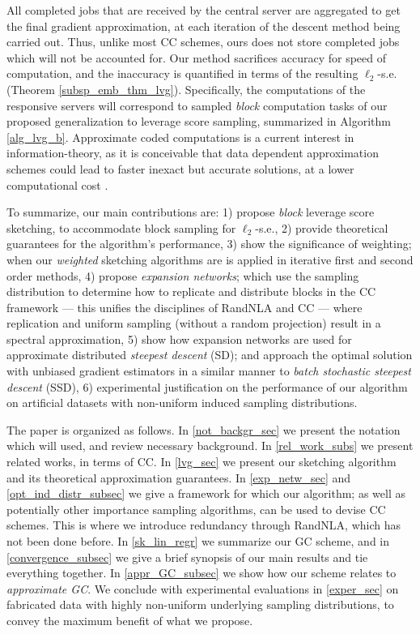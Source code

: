 \documentclass[journal,letterpaper,onecolumn,twoside,nofonttune]{IEEEtran}
\begin{document}
All completed jobs that are received by the central server are aggregated to get the final gradient approximation, at each iteration of the descent method being carried out. Thus, unlike most CC schemes, ours does not store completed jobs which will not be accounted for. Our method sacrifices accuracy for speed of computation, and the inaccuracy is quantified in terms of the resulting $\ell_2$-s.e. (Theorem \ref{subsp_emb_thm_lvg}). Specifically, the computations of the responsive servers will correspond to sampled \textit{block} computation tasks of our proposed generalization to leverage score sampling, summarized in Algorithm \ref{alg_lvg_b}. Approximate coded computations is a current interest in information-theory, as it is conceivable that data dependent approximation schemes could lead to faster inexact but accurate solutions, at a lower computational cost \cite{LA20}.

To summarize, our main contributions are: 1) propose \textit{block} leverage score sketching, to accommodate block sampling for $\ell_2$-s.e., 2) provide theoretical guarantees for the algorithm's performance, 3) show the significance of weighting; when our \textit{weighted} sketching algorithms are is applied in iterative first and second order methods, 4) propose \textit{expansion networks}; which use the sampling distribution to determine how to replicate and distribute blocks in the CC framework --- this unifies the disciplines of RandNLA and CC --- where replication and uniform sampling (without a random projection) result in a spectral approximation, 5) show how expansion networks are used for approximate distributed \textit{steepest descent} (SD); and approach the optimal solution with unbiased gradient estimators in a similar manner to \textit{batch stochastic steepest descent} (SSD), 6) experimental justification on the performance of our algorithm on artificial datasets with non-uniform induced sampling distributions.

The paper is organized as follows. In \ref{not_backgr_sec} we present the notation which will used, and review necessary background. In \ref{rel_work_subs} we present related works, in terms of CC. In \ref{lvg_sec} we present our sketching algorithm and its theoretical approximation guarantees. In \ref{exp_netw_sec} and \ref{opt_ind_distr_subsec} we give a framework for which our algorithm; as well as potentially other importance sampling algorithms, can be used to devise CC schemes. This is where we introduce redundancy through RandNLA, which has not been done before. In \ref{sk_lin_regr} we summarize our GC scheme, and in \ref{convergence_subsec} we give a brief synopsis of our main results and tie everything together. In \ref{appr_GC_subsec} we show how our scheme relates to \textit{approximate GC}. We conclude with experimental evaluations in \ref{exper_sec} on fabricated data with highly non-uniform underlying sampling distributions, to convey the maximum benefit of what we propose.
\end{document}
